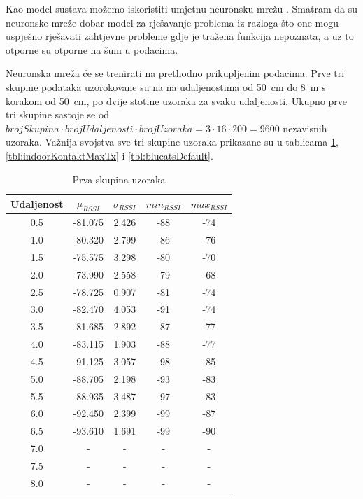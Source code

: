 Kao model sustava možemo iskoristiti umjetnu neuronsku mrežu .  
Smatram da su neuronske mreže dobar model za rješavanje problema iz razloga što one mogu uspješno rješavati zahtjevne probleme gdje je tražena funkcija nepoznata, a uz to otporne su otporne na šum u podacima. 

Neuronska mreža će se trenirati na prethodno prikupljenim podacima. 
Prve tri skupine podataka uzorokovane su na na udaljenostima od \SI{50}{cm} do \SI{8}{m} s korakom od \SI{50}{cm}, po dvije stotine uzoraka za svaku udaljenosti. 
Ukupno prve tri skupine sastoje se od $brojSkupina \cdot brojUdaljenosti \cdot brojUzoraka = 3 \cdot 16 \cdot 200 = 9600$ nezavisnih uzoraka. 
Važnija svojstva sve tri skupine uzoraka prikazane su u tablicama \ref{tbl:indoorKontaktDefaultTx}, \ref{tbl:indoorKontaktMaxTx} i \ref{tbl:blucatsDefault}.

\begin{table}[H]
	\centering
	\caption{Prva skupina uzoraka}
	\label{tbl:indoorKontaktDefaultTx}
	\begin{tabular}{ccccc}
	\hline
	Udaljenost & $\mu_{RSSI}$ & $\sigma_{RSSI}$ & $min_{RSSI}$ & $max_{RSSI}$ \\
	\hline
	0.5 & -81.075 & 2.426 & -88 & -74 \\
	1.0 & -80.320 & 2.799 & -86 & -76 \\
	1.5 & -75.575 & 3.298 & -80 & -70 \\
	2.0 & -73.990 & 2.558 & -79 & -68 \\
	2.5 & -78.725 & 0.907 & -81 & -74 \\
	3.0 & -82.470 & 4.053 & -91 & -74 \\
	3.5 & -81.685 & 2.892 & -87 & -77 \\
	4.0 & -83.115 & 1.903 & -88 & -77 \\
	4.5 & -91.125 & 3.057 & -98 & -85 \\
	5.0 & -88.705 & 2.198 & -93 & -83 \\
	5.5 & -88.935 & 3.487 & -97 & -83 \\
	6.0 & -92.450 & 2.399 & -99 & -87 \\
	6.5 & -93.610 & 1.691 & -99 & -90 \\
	7.0 & - & - & - & - \\
	7.5 & - & - & - & - \\
	8.0 & - & - & - & - \\
	\hline
	\end{tabular}
\end{table}

